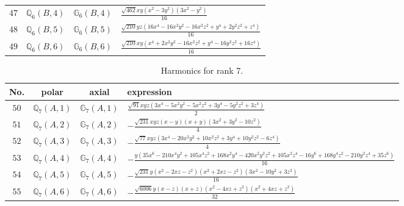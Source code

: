 \documentclass[fleqn,8pt,landscape]{jsarticle}
\begin{document}
\begin{table}[ht!]
\begin{center}
\begin{tabular}{cccl}
$ 47 $ & $ \mathbb{Q}_{6}(B,4) $ & $ \mathbb{G}_{6}(B,4) $ & $ \frac{\sqrt{462} x y \left(x^{2} - 3 y^{2}\right) \left(3 x^{2} - y^{2}\right)}{16} $ \\
$ 48 $ & $ \mathbb{Q}_{6}(B,5) $ & $ \mathbb{G}_{6}(B,5) $ & $ \frac{\sqrt{210} y z \left(16 x^{4} - 16 x^{2} y^{2} - 16 x^{2} z^{2} + y^{4} + 2 y^{2} z^{2} + z^{4}\right)}{16} $ \\
$ 49 $ & $ \mathbb{Q}_{6}(B,6) $ & $ \mathbb{G}_{6}(B,6) $ & $ \frac{\sqrt{210} x y \left(x^{4} + 2 x^{2} y^{2} - 16 x^{2} z^{2} + y^{4} - 16 y^{2} z^{2} + 16 z^{4}\right)}{16} $ \\
 \hline \hline
\end{tabular}
\end{center}
\end{table}
\begin{table}[ht!]
\begin{center}
\caption{Harmonics for rank 7.}
\renewcommand{\arraystretch}{1.3}
\begin{tabular}{cccl} \hline \hline
No. & polar & axial & expression \\ \hline
$ 50 $ & $ \mathbb{Q}_{7}(A,1) $ & $ \mathbb{G}_{7}(A,1) $ & $ \frac{\sqrt{91} x y z \left(3 x^{4} - 5 x^{2} y^{2} - 5 x^{2} z^{2} + 3 y^{4} - 5 y^{2} z^{2} + 3 z^{4}\right)}{2} $ \\
$ 51 $ & $ \mathbb{Q}_{7}(A,2) $ & $ \mathbb{G}_{7}(A,2) $ & $ - \frac{\sqrt{231} x y z \left(x - y\right) \left(x + y\right) \left(3 x^{2} + 3 y^{2} - 10 z^{2}\right)}{4} $ \\
$ 52 $ & $ \mathbb{Q}_{7}(A,3) $ & $ \mathbb{G}_{7}(A,3) $ & $ - \frac{\sqrt{77} x y z \left(3 x^{4} - 20 x^{2} y^{2} + 10 x^{2} z^{2} + 3 y^{4} + 10 y^{2} z^{2} - 6 z^{4}\right)}{4} $ \\
$ 53 $ & $ \mathbb{Q}_{7}(A,4) $ & $ \mathbb{G}_{7}(A,4) $ & $ - \frac{y \left(35 x^{6} - 210 x^{4} y^{2} + 105 x^{4} z^{2} + 168 x^{2} y^{4} - 420 x^{2} y^{2} z^{2} + 105 x^{2} z^{4} - 16 y^{6} + 168 y^{4} z^{2} - 210 y^{2} z^{4} + 35 z^{6}\right)}{16} $ \\
$ 54 $ & $ \mathbb{Q}_{7}(A,5) $ & $ \mathbb{G}_{7}(A,5) $ & $ - \frac{\sqrt{231} y \left(x^{2} - 2 x z - z^{2}\right) \left(x^{2} + 2 x z - z^{2}\right) \left(3 x^{2} - 10 y^{2} + 3 z^{2}\right)}{16} $ \\
$ 55 $ & $ \mathbb{Q}_{7}(A,6) $ & $ \mathbb{G}_{7}(A,6) $ & $ - \frac{\sqrt{6006} y \left(x - z\right) \left(x + z\right) \left(x^{2} - 4 x z + z^{2}\right) \left(x^{2} + 4 x z + z^{2}\right)}{32} $ \\

\end{tabular}
\end{center}
\end{table}
\end{document}
